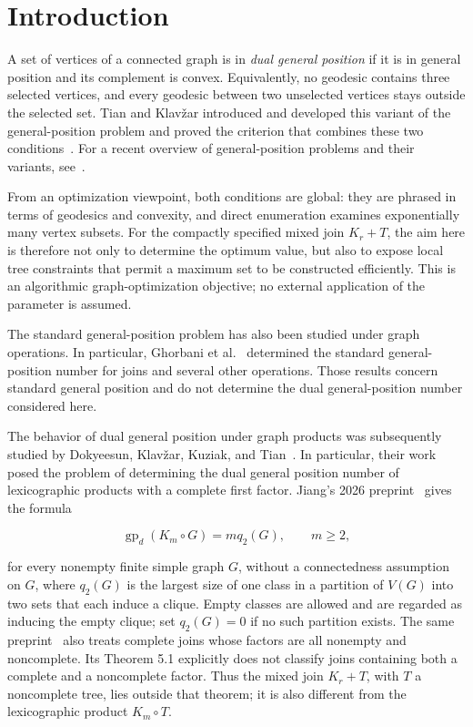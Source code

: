 \documentclass[preprint,12pt]{elsarticle}
\numberwithin{equation}{section}
\begin{document}
\section{Introduction}\label{sec:introduction}

A set of vertices of a connected graph is in \emph{dual general
position} if it is in general position and its complement is convex.
Equivalently, no geodesic contains three selected vertices, and every
geodesic between two unselected vertices stays outside the selected set.
Tian and Klav\v{z}ar introduced and developed this variant of the
general-position problem and proved the criterion that combines these
two conditions~\cite{tian-klavzar-variety}. For a recent overview of
general-position problems and their variants, see~\cite{chandran-et-al-survey}.

From an optimization viewpoint, both conditions are global: they are phrased
in terms of geodesics and convexity, and direct enumeration examines
exponentially many vertex subsets. For the compactly specified mixed join
\(K_r+T\), the aim here is therefore not only to determine the optimum value,
but also to expose local tree constraints that permit a maximum set to be
constructed efficiently. This is an algorithmic graph-optimization objective;
no external application of the parameter is assumed.

The standard general-position problem has also been studied under graph
operations. In particular, Ghorbani et al.~\cite{ghorbani-et-al-operations}
determined the standard general-position number for joins and several
other operations. Those results concern standard general position and do
not determine the dual general-position number considered here.

The behavior of dual general position under graph products was
subsequently studied by Dokyeesun, Klav\v{z}ar, Kuziak, and Tian~\cite{dokyeesun-et-al-products}. In
particular, their work posed the problem of determining the dual general
position number of lexicographic products with a complete first factor.
Jiang's 2026 preprint~\cite[Theorem 3.2]{jiang-complete-first-factor} gives the formula

\[
\operatorname{gp}_d(K_m\circ G)=m q_2(G), \qquad m\ge 2,
\]

for every nonempty finite simple graph \(G\), without a connectedness
assumption on \(G\), where \(q_2(G)\) is the
largest size of one class in a partition of \(V(G)\) into two sets that
each induce a clique. Empty classes are allowed and are regarded as
inducing the empty clique; set \(q_2(G)=0\) if no such partition exists. The
same preprint~\cite[Theorem 5.1]{jiang-complete-first-factor} also treats
complete joins whose factors are all nonempty and noncomplete. Its Theorem 5.1 explicitly
does not classify joins containing both a complete and a noncomplete
factor. Thus the mixed join \(K_r+T\), with \(T\) a noncomplete tree,
lies outside that theorem; it is also different from the lexicographic
product \(K_m\circ T\).
\end{document}

